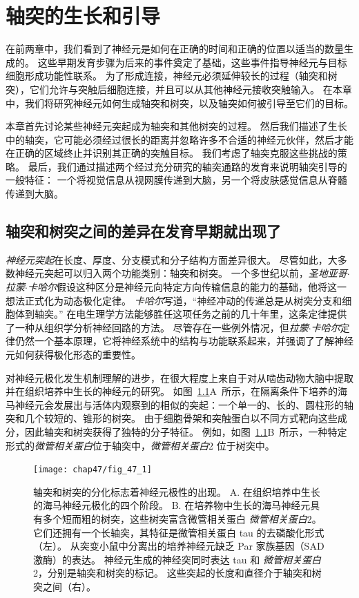 \chapter{轴突的生长和引导} \label{chap:chap47}


在前两章中，我们看到了神经元是如何在正确的时间和正确的位置以适当的数量生成的。
这些早期发育步骤为后来的事件奠定了基础，这些事件指导神经元与目标细胞形成功能性联系。
为了形成连接，神经元必须延伸较长的过程（轴突和树突），它们允许与突触后细胞连接，并且可以从其他神经元接收突触输入。
在本章中，我们将研究神经元如何生成轴突和树突，以及轴突如何被引导至它们的目标。


本章首先讨论某些神经元突起成为轴突和其他树突的过程。
然后我们描述了生长中的轴突，它可能必须经过很长的距离并忽略许多不合适的神经元伙伴，然后才能在正确的区域终止并识别其正确的突触目标。
我们考虑了轴突克服这些挑战的策略。
最后，我们通过描述两个经过充分研究的轴突通路的发育来说明轴突引导的一般特征：
一个将视觉信息从视网膜传递到大脑，另一个将皮肤感觉信息从脊髓传递到大脑。



\section{轴突和树突之间的差异在发育早期就出现了}

\textit{神经元突起}在长度、厚度、分支模式和分子结构方面差异很大。
尽管如此，大多数神经元突起可以归入两个功能类别：轴突和树突。
一个多世纪以前，\textit{圣地亚哥$\cdot$拉蒙$\cdot$卡哈尔}假设这种区分是神经元向特定方向传输信息的能力的基础，他将这一想法正式化为动态极化定律。
\textit{卡哈尔}写道，“神经冲动的传递总是从树突分支和细胞体到轴突。” 
在电生理学方法能够胜任这项任务之前的几十年里，这条定律提供了一种从组织学分析神经回路的方法。
尽管存在一些例外情况，但\textit{拉蒙$\cdot$卡哈尔}定律仍然一个基本原理，它将神经系统中的结构与功能联系起来，并强调了了解神经元如何获得极化形态的重要性。


对神经元极化发生机制理解的进步，在很大程度上来自于对从啮齿动物大脑中提取并在组织培养中生长的神经元的研究。
如图~\ref{fig:47_1}A~所示，在隔离条件下培养的海马神经元会发展出与活体内观察到的相似的突起：一个单一的、长的、圆柱形的轴突和几个较短的、锥形的树突。
由于细胞骨架和突触蛋白以不同方式靶向这些成分，因此轴突和树突获得了独特的分子特征。
例如，如图~\ref{fig:47_1}B~所示，一种特定形式的\textit{微管相关蛋白}位于轴突中，\textit{微管相关蛋白}2 位于树突中。


\begin{figure}[htbp]
	\centering
	\texttt{[image: chap47/fig\_47\_1]}
	\caption{轴突和树突的分化标志着神经元极性的出现。
		A. 在组织培养中生长的海马神经元极化的四个阶段\cite{kaech2006culturing}。
		B. 在培养物中生长的海马神经元具有多个短而粗的树突，这些树突富含微管相关蛋白 \textit{微管相关蛋白}2。
		它们还拥有一个长轴突，其特征是微管相关蛋白 tau 的去磷酸化形式（左）。
		从突变小鼠中分离出的培养神经元缺乏 Par 家族基因（SAD 激酶）的表达。
		神经元生成的神经突同时表达 tau 和 \textit{微管相关蛋白}2，分别是轴突和树突的标记。
		这些突起的长度和直径介于轴突和树突之间（右）\cite{kishi2005mammalian}。}
	\label{fig:47_1}
\end{figure}


